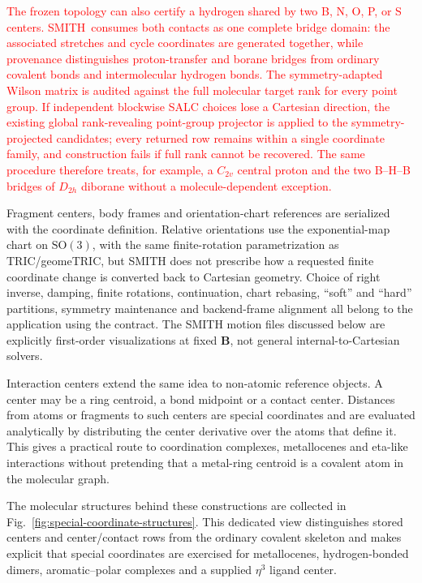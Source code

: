\documentclass[journal=jctcce,manuscript=article,layout=traditional]{achemso}
\newcommand{\SMITH}{\textsc{SMITH}}
\newcommand{\Bmat}{\mathbf{B}}
\theoremstyle{definition}
\begin{document}
\textcolor{red}{The frozen topology can also certify a hydrogen shared by
two B, N, O, P, or S centers.  \SMITH\ consumes both contacts as one complete
bridge domain: the associated stretches and cycle coordinates are generated
together, while provenance distinguishes proton-transfer and borane bridges
from ordinary covalent bonds and intermolecular hydrogen bonds.  The
symmetry-adapted Wilson matrix is audited against the full molecular target
rank for every point group.  If independent blockwise SALC choices lose a
Cartesian direction, the existing global rank-revealing point-group projector
is applied to the symmetry-projected candidates; every returned row remains
within a single coordinate family, and construction fails if full rank cannot
be recovered.  The same procedure therefore treats, for example, a
\(C_{2v}\) central proton and the two B--H--B bridges of
\(D_{2h}\) diborane without a molecule-dependent exception.}

Fragment centers, body frames and orientation-chart references are serialized
with the coordinate definition.  Relative orientations use the exponential-map
chart on \(\mathrm{SO}(3)\), with the same finite-rotation parametrization as
TRIC/geomeTRIC, but SMITH does not prescribe how a requested finite coordinate
change is converted back to Cartesian geometry.  Choice of right inverse,
damping, finite rotations, continuation, chart rebasing, ``soft'' and ``hard''
partitions, symmetry maintenance and backend-frame alignment all belong to the
application using the contract.  The SMITH motion files discussed below are
explicitly first-order visualizations at fixed \(\Bmat\), not general
internal-to-Cartesian solvers.

Interaction centers extend the same idea to non-atomic reference objects.  A
center may be a ring centroid, a bond midpoint or a contact center.  Distances
from atoms or fragments to such centers are special coordinates and
are evaluated analytically by distributing the center derivative over the atoms
that define it.  This gives a practical route to coordination complexes,
metallocenes and eta-like interactions without pretending that a metal-ring
centroid is a covalent atom in the molecular graph.

The molecular structures behind these constructions are collected in
Fig.~\ref{fig:special-coordinate-structures}.  This dedicated view distinguishes
stored centers and center/contact rows from the ordinary covalent skeleton and
makes explicit that special coordinates are exercised for metallocenes,
hydrogen-bonded dimers, aromatic--polar complexes and a supplied
$\eta^3$ ligand center.
\end{document}
